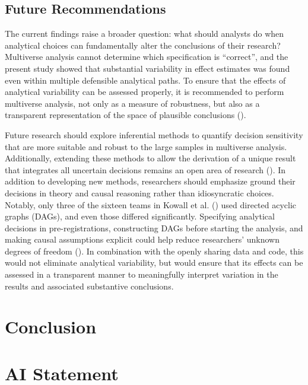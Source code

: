 \documentclass[
  man,
  floatsintext,
  longtable,
  nolmodern,
  notxfonts,
  notimes,
  colorlinks=true,linkcolor=blue,citecolor=blue,urlcolor=blue]{apa7}
\begin{document}
\subsection{Future Recommendations}\label{future-recommendations}

The current findings raise a broader question: what should analysts do
when analytical choices can fundamentally alter the conclusions of their
research? Multiverse analysis cannot determine which specification is
``correct'', and the present study showed that substantial variability
in effect estimates was found even within multiple defensible analytical
paths. To ensure that the effects of analytical variability can be
assessed properly, it is recommended to perform multiverse analysis, not
only as a measure of robustness, but also as a transparent
representation of the space of plausible conclusions
().

Future research should explore inferential methods to quantify decision
sensitivity that are more suitable and robust to the large samples in
multiverse analysis. Additionally, extending these methods to allow the
derivation of a unique result that integrates all uncertain decisions
remains an open area of research
(). In
addition to developing new methods, researchers should emphasize ground
their decisions in theory and causal reasoning rather than idiosyncratic
choices. Notably, only three of the sixteen teams in Kowall et al.
() used directed acyclic graphs
(DAGs), and even those differed significantly. Specifying analytical
decisions in pre-registrations, constructing DAGs before starting the
analysis, and making causal assumptions explicit could help reduce
researchers' unknown degrees of freedom
(). In combination with the openly sharing data and code, this would
not eliminate analytical variability, but would ensure that its effects
can be assessed in a transparent manner to meaningfully interpret
variation in the results and associated substantive conclusions.

\section{Conclusion}\label{conclusion}

\section{AI Statement}\label{ai-statement}
\end{document}

